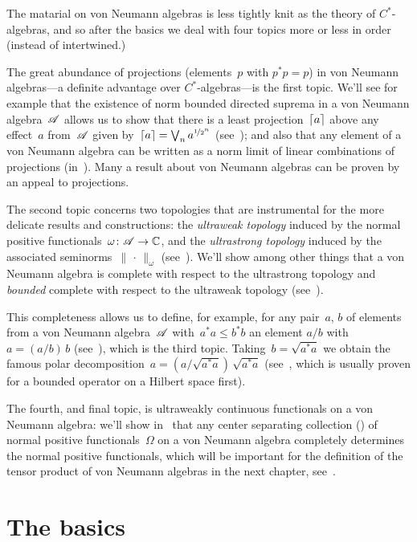 \documentclass[a]{subfiles}
\begin{document}
\begin{parsec}
The matarial on von Neumann algebras
is less tightly knit as the theory of $C^*$-algebras,
and so after the basics
we deal with four topics
more or less in order
(instead of intertwined.)

The great abundance of projections
(elements~$p$ with $p^*p=p$)
in von Neumann algebras---a definite advantage
over $C^*$-algebras---is
the first topic.
We'll see for example that
the existence of norm bounded directed suprema
in a von Neumann algebra~$\mathscr{A}$
allows us to show
that
there is a least projection~$\left\lceil a\right\rceil$
above any effect~$a$ from~$\mathscr{A}$
given by~$\left\lceil a\right\rceil=\bigvee_n a^{\nicefrac{1}{2}^n}$
(see~);
and also that any element of a von Neumann algebra
can be written as a norm limit
of linear combinations of projections (in~).
Many a result about von Neumann algebras
can be proven by an appeal to projections.

The second topic concerns
two topologies that are instrumental
for the more delicate results and constructions:
the \emph{ultraweak topology}
induced by the normal positive functionals~$\omega\colon\mathscr{A}\to\mathbb{C}$,
and the \emph{ultrastrong topology}
induced by the associated seminorms~$\|\,\cdot\,\|_\omega$
(see~).
We'll show among other things that a von Neumann algebra
is complete with respect to the ultrastrong topology
and \emph{bounded} complete with respect to the ultraweak topology
(see~).

This completeness allows us to
define,
for example,
for any pair~$a$, $b$ of elements
from a von Neumann algebra~$\mathscr{A}$
with~$a^*a\leq b^*b$
an element $a/b$
with~$a=(a/b) \, b $
(see~),
which is the third topic.
Taking~$b=\sqrt{a^*a}$ we
obtain
the famous
polar decomposition~$a = (a/\sqrt{a^*a}) \, \sqrt{a^*a}$
(see~,
which is usually proven 
for a bounded operator on a Hilbert space first).

The fourth, and final topic,
is ultraweakly continuous functionals
on a von Neumann algebra:
we'll show
in~
that any center separating collection ()
of normal positive functionals~$\Omega$
on a von Neumann algebra completely
determines the normal positive functionals,
which will be important for the definition of the tensor
product of von Neumann algebras in the next chapter,
see~.
\end{parsec}
\section{The basics}
\end{document}
